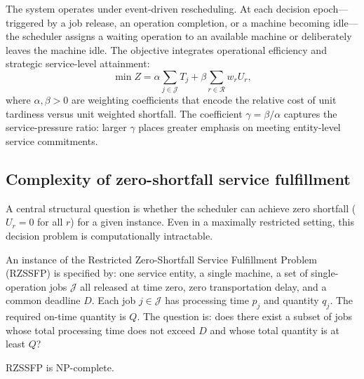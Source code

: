 The system operates under event-driven rescheduling. At each decision epoch---triggered by a job release, an operation completion, or a machine becoming idle---the scheduler assigns a waiting operation to an available machine or deliberately leaves the machine idle. The objective integrates operational efficiency and strategic service-level attainment:
\begin{equation}\label{eq:objective}
\min Z=\alpha\sum_{j\in\mathcal J}T_j+\beta\sum_{r\in\mathcal R}w_r U_r,
\end{equation}
where $\alpha,\beta>0$ are weighting coefficients that encode the relative cost of unit tardiness versus unit weighted shortfall. The coefficient $\gamma=\beta/\alpha$ captures the service-pressure ratio: larger $\gamma$ places greater emphasis on meeting entity-level service commitments.

\subsection{Complexity of zero-shortfall service fulfillment}
\label{sec:complexity}

A central structural question is whether the scheduler can achieve zero shortfall ($U_r=0$ for all $r$) for a given instance. Even in a maximally restricted setting, this decision problem is computationally intractable.

\begin{definition}
\label{def:rzssfp}
An instance of the Restricted Zero-Shortfall Service Fulfillment Problem (RZSSFP) is specified by: one service entity, a single machine, a set of single-operation jobs $\mathcal J$ all released at time zero, zero transportation delay, and a common deadline $D$. Each job $j\in\mathcal J$ has processing time $p_j$ and quantity $q_j$. The required on-time quantity is $Q$. The question is: does there exist a subset of jobs whose total processing time does not exceed $D$ and whose total quantity is at least $Q$?
\end{definition}

\begin{theorem}\label{thm:np_complete}
RZSSFP is NP-complete.
\end{theorem}

